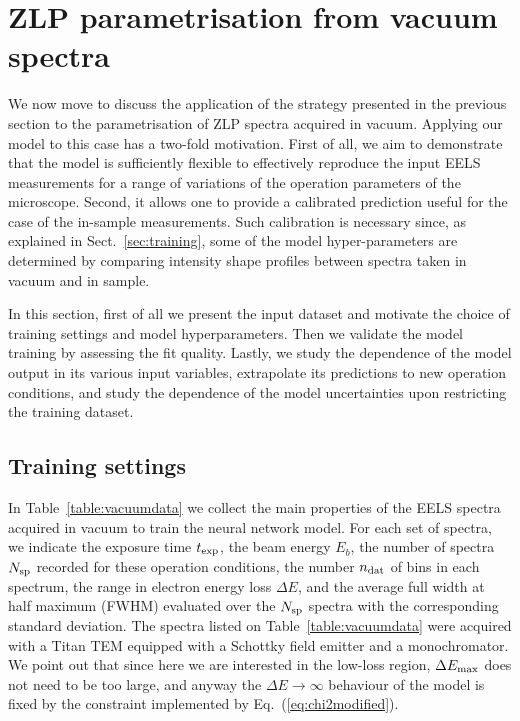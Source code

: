 \section{ZLP parametrisation from vacuum spectra}
\label{sec:results_vacuum}

We now move to discuss the application of the strategy presented in the previous
section to the parametrisation of ZLP spectra acquired in vacuum.
%
Applying our model to this case has a two-fold motivation.
%
First of all, we aim to demonstrate that the model is sufficiently flexible
to effectively reproduce the
input EELS measurements for a range of variations of the operation parameters of the microscope.
%
Second, it allows one to provide a calibrated prediction
useful for the case of the in-sample measurements.
%
Such calibration is necessary since, as explained in Sect.~\ref{sec:training}, some of the model
hyper-parameters are determined by comparing intensity shape profiles
between spectra taken in vacuum and in sample.

In this section, first of all we present the input dataset and motivate the choice
of training settings and model hyperparameters.
%
Then we validate the model training by assessing the fit quality.
%
Lastly, we study the dependence of the model output in its various input
variables, extrapolate  its predictions to new operation
conditions, and study the dependence of the model uncertainties upon
restricting the training dataset.

\subsection{Training settings}

In Table~\ref{table:vacuumdata} we collect the main properties of the EELS spectra
acquired in vacuum to train the neural
network model.  For each set of spectra, we indicate the exposure time $t_{\rm exp}$, the beam energy
$E_b$, the number of spectra $N_{\rm sp}$ recorded for these operation conditions, the number $n_{\rm dat}$ of
bins in each spectrum, the range in electron energy loss $\Delta E$,
and the average full width at half maximum (FWHM)
evaluated over the $N_{\rm sp}$ spectra with the corresponding standard deviation.
%
The spectra  listed on Table~\ref{table:vacuumdata}
were acquired with a Titan TEM equipped with a Schottky field emitter
and a monochromator.
%
We point out that since here
we are interested in the low-loss region, $\Delta E_{\rm max}$ does not need
to be too large, and anyway the $\Delta E\to \infty$ behaviour of the model is fixed
by the constraint implemented by Eq.~(\ref{eq:chi2modified}).

